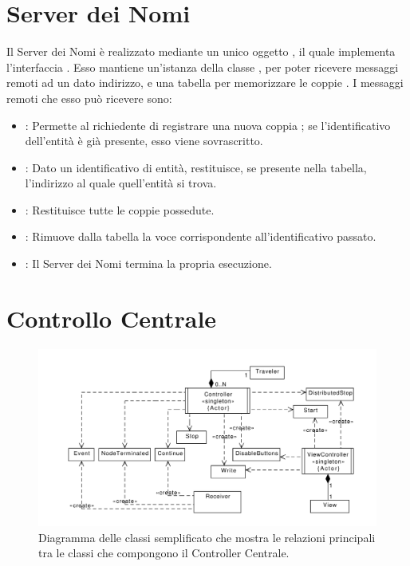 	\section{Server dei Nomi}
	
	Il Server dei Nomi è realizzato mediante un unico oggetto  , il quale implementa l'interfaccia . Esso mantiene un'istanza della classe , per poter ricevere messaggi remoti ad un dato indirizzo, e una tabella per memorizzare le coppie . I messaggi remoti che esso può ricevere sono:
	\begin{itemize}
		\item {}: Permette al richiedente di registrare una nuova coppia ; se l'identificativo dell'entità è già presente, esso viene sovrascritto.
		\item {}: Dato un identificativo di entità, restituisce, se presente nella tabella, l'indirizzo al quale quell'entità si trova.
		\item {}: Restituisce tutte le coppie  possedute.
		\item {}: Rimuove dalla tabella la voce corrispondente all'identificativo passato.
		\item {}: Il Server dei Nomi termina la propria esecuzione.
	\end{itemize}
	
	\section{Controllo Centrale}
	
	\begin{figure}[htbp]
		\includegraphics[scale=0.6,trim= 30mm 0mm 0mm 10mm]{imgs/Controller_Class_Diagram.pdf}
		\caption{\footnotesize{Diagramma delle classi semplificato che mostra le relazioni principali tra le classi che compongono il Controller Centrale.}}
		\label{img:ticket_office_class_diagram}
	\end{figure}
	
